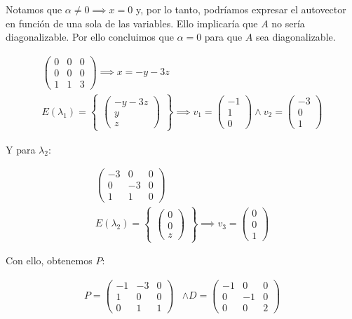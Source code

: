 \documentclass[12pt]{article}
\begin{document}
Notamos que \(\alpha \neq 0 \implies x=0\) y,
por lo tanto,
podríamos expresar el autovector en función de una sola de las variables.
Ello implicaría que \(A\) no sería diagonalizable.
Por ello concluimos que \(\alpha = 0\) para que \(A\) sea diagonalizable.

\begin{align*}
	\begin{pmatrix}
		0 & 0 & 0 \\0&0&0\\1&1&3
	\end{pmatrix}
	\implies
	x=-y-3z \\
	E(\lambda_{1}) =
	\begin{Bmatrix}
		\begin{pmatrix}
			-y-3z \\y\\z
		\end{pmatrix}
	\end{Bmatrix}
	\implies
	v_{1} =
	\begin{pmatrix}
		-1 \\1\\0
	\end{pmatrix}
	\land
	v_{2} =
	\begin{pmatrix}
		-3 \\0\\1
	\end{pmatrix}
\end{align*}

Y para \(\lambda_{2}\):

\begin{align*}
	\begin{pmatrix}
		-3 & 0 & 0 \\0&-3&0\\1&1&0
	\end{pmatrix} \\
	E(\lambda_{2}) =
	\begin{Bmatrix}
		\begin{pmatrix}
			0 \\0\\z
		\end{pmatrix}
	\end{Bmatrix}
	\implies
	v_{3} =
	\begin{pmatrix}
		0 \\0\\1
	\end{pmatrix}
\end{align*}

Con ello, obtenemos \(P\):

\begin{align*}
	P =
	\begin{pmatrix}
		-1 & -3 & 0 \\
		1  & 0  & 0 \\
		0  & 1  & 1
	\end{pmatrix}
	 & \land
	D =
	\begin{pmatrix}
		-1 & 0  & 0 \\
		0  & -1 & 0 \\
		0  & 0  & 2
	\end{pmatrix}
\end{align*}
\end{document}
